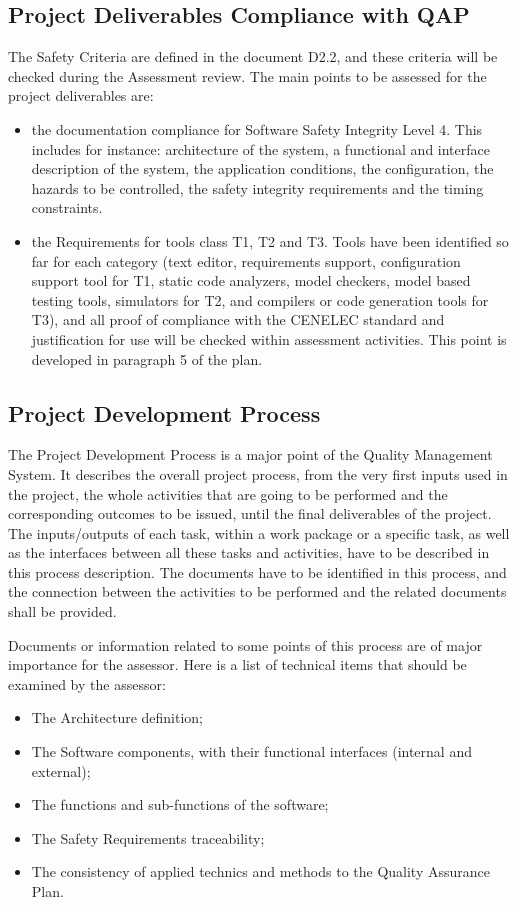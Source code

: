 \documentclass[openetcs]{template/openetcs_article}
\begin{document}
\subsection{Project Deliverables Compliance with QAP}
The Safety Criteria are defined in the document D2.2, and these criteria will be checked during the Assessment review. The main points to be assessed
for the project deliverables are:
\begin{itemize}
\item the documentation compliance for Software Safety Integrity Level 4. This includes for instance: architecture of the system, a functional and interface description of the system, the
application conditions, the configuration, the hazards to be controlled, the safety integrity requirements and the timing constraints.
\item the Requirements for tools class T1, T2 and T3. Tools have been identified so far for each category (text editor, requirements support, configuration
support tool for T1, static code analyzers, model checkers, model based testing tools, simulators for T2, and compilers or code generation tools for T3), and
all proof of compliance with the CENELEC standard and justification for use will be checked within assessment activities. This point is developed in
paragraph 5 of the plan.
\end{itemize}

\subsection{Project Development Process}
The Project Development Process is a major point of the Quality Management System. It describes the overall project process, from the very first inputs used in
the project, the whole activities that are going to be performed and the corresponding outcomes to be issued, until the final deliverables of the project. The
inputs/outputs of each task, within a work package or a specific task, as well as the interfaces between all these tasks and activities, have to be described in
this process description.
The documents have to be identified in this process, and the connection  between the activities to be performed and the related documents shall be provided.

Documents or information related to some points of this process are of major importance for the assessor. Here is a list of technical items that should be examined by the assessor:
\begin{itemize}
\item The Architecture definition;
\item The Software components, with their functional interfaces (internal and external);
\item The functions and sub-functions of the software;
\item The Safety Requirements traceability;
\item The consistency of applied technics and methods to the Quality Assurance Plan.
\end{itemize}
\end{document}
